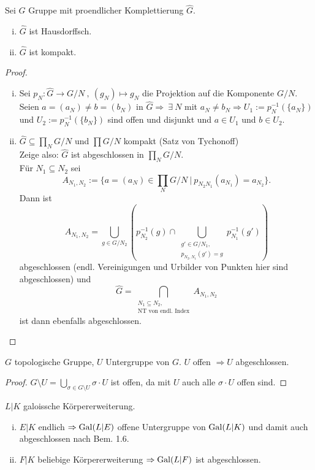 \begin{Prop}
Sei $G$ Gruppe mit proendlicher Komplettierung $\hat{G}$.
\begin{enumerate}[(i)]
\item $\hat{G}$ ist Hausdorffsch.
\item $\hat{G}$ ist kompakt.
\end{enumerate}
\end{Prop}

\begin{proof}
\begin{enumerate}[i)]
\item Sei $p_N : \hat{G} \to G/N \ , \ (g_N) \mapsto g_N$ die Projektion auf die Komponente $G/N$.\\
Seien $a=(a_N) \neq b = (b_N)$ in $\hat{G} \Rightarrow \ \exists \ N$ mit $a_N \neq b_N \Rightarrow U_1:= p_N^{-1}(\{a_N\})$ und $U_2:=p_N^{-1}(\{b_N\})$ sind offen und disjunkt und $a \in U_1$ und $b \in U_2$.
\item $\hat{G} \subseteq \prod_N G/N$ und $\prod G/N$ kompakt (Satz von Tychonoff)\\
Zeige also: $\hat{G}$ ist abgeschlossen in $\prod_N G/N$.\\
Für $N_1 \subseteq N_2$ sei
\[A_{N_1, N_2} :=\{a=(a_N) \in \prod_N G/N \ | \ p_{N_2 N_1}(a_{N_1})=a_{N_2}\}.\]
Dann ist 
\[A_{N_1, N_2} = \bigcup \limits_{g \in G/N_2} (p_{N_2}^{-1}(g) \cap \bigcup \limits_{\substack{g' \in G/N_1,\\ p_{N_2, N_1}(g')=g}} p^{-1}_{N_1}(g'))\]
abgeschlossen (endl. Vereinigungen und Urbilder von Punkten hier sind abgeschlossen) und
\[\hat{G} = \bigcap \limits_{\substack{N_1 \subseteq N_2 ,\\ \text{NT von endl. Index}}} A_{N_1, N_2}\]
ist dann ebenfalls abgeschlossen.
\end{enumerate}
\end{proof}

\begin{Bem}
$G$ topologische Gruppe, $U$ Untergruppe von $G$. $U$ offen $\Rightarrow U$ abgeschlossen.
\end{Bem}

\begin{proof}
$G \setminus U = \bigcup_{\sigma \in G \setminus U} \sigma \cdot U$ ist offen, da mit $U$ auch alle $\sigma \cdot U$ offen sind.
\end{proof}

\begin{Prop}
$L|K$ galoissche Körpererweiterung.
\begin{enumerate}[i)]
\item $E|K$ endlich $\Rightarrow \operatorname{Gal}(L|E)$ offene Untergruppe von $\operatorname{Gal}(L|K)$ und damit auch abgeschlossen nach Bem. 1.6.
\item $F|K$ beliebige Körpererweiterung $\Rightarrow \operatorname{Gal}(L|F)$ ist abgeschlossen.
\end{enumerate}
\end{Prop}

